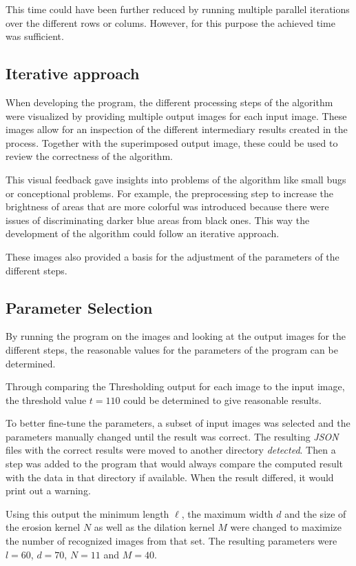 \documentclass[serif,article,noparskip]{agse-thesis}
\begin{document}
This time could have been further reduced by running multiple parallel
iterations over the different rows or colums. However, for this purpose the
achieved time was sufficient.

\subsection{Iterative approach} \label{iterative}

When developing the program, the different processing steps of the algorithm
were visualized by providing multiple output images for each input image. These
images allow for an inspection of the different intermediary results created in the
process. Together with the superimposed output image, these could be used to
review the correctness of the algorithm.

This visual feedback gave insights into problems of the algorithm like small
bugs or conceptional problems. For example, the preprocessing step to increase
the brightness of areas that are more colorful was introduced because there were
issues of discriminating darker blue areas from black ones. This way the
development of the algorithm could follow an iterative approach.

These images also provided a basis for the adjustment of the parameters of the
different steps.

\subsection{Parameter Selection} \label{parameter}

By running the program on the images and looking at the output images for the
different steps, the reasonable values for the parameters of the program can be
determined.

Through comparing the Thresholding output for each image to the input image, the
threshold value $t = 110$ could be determined to give reasonable results.

To better fine-tune the parameters, a subset of input images was selected and
the parameters manually changed until the result was correct. The resulting
\textit{JSON} files with the correct results were moved to another directory
\textit{detected}. Then a step was added to the program that would always
compare the computed result with the data in that directory if available. When
the result differed, it would print out a warning.

Using this output the minimum length $\ell$, the maximum width $d$ and the size
of the erosion kernel $N$ as well as the dilation kernel $M$ were changed to
maximize the number of recognized images from that set. The resulting parameters
were $l = 60$, $d = 70$, $N=11$ and $M =40$.
\end{document}
